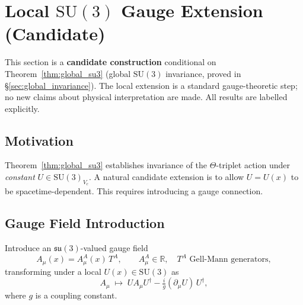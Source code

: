 %
%


\section{Local $\mathrm{SU}(3)$ Gauge Extension (Candidate)}
\label{sec:local_gauge}

\begin{tcolorbox}[colback=yellow!5!white,colframe=orange!80!black,
  title=Status: Candidate Extension]
  This section is a \textbf{candidate construction} conditional on
  Theorem~\ref{thm:global_su3} (global $\mathrm{SU}(3)$ invariance,
  proved in \S\ref{sec:global_invariance}).  The local extension is a
  standard gauge-theoretic step; no new claims about physical interpretation
  are made.  All results are labelled explicitly.
\end{tcolorbox}

\subsection{Motivation}

Theorem~\ref{thm:global_su3} establishes invariance of the $\Theta$-triplet
action under \emph{constant} $U\in\mathrm{SU}(3)_{V_c}$.  A natural candidate
extension is to allow $U=U(x)$ to be spacetime-dependent.  This requires
introducing a gauge connection.

\subsection{Gauge Field Introduction}

\begin{definition}
  \label{def:gauge_field}
  Introduce an $\mathfrak{su}(3)$-valued gauge field
  \begin{equation}
    A_\mu(x) = A_\mu^A(x)\,T^A,
    \qquad A_\mu^A\in\mathbb{R},\quad T^A\text{ Gell-Mann generators},
  \end{equation}
  transforming under a local $U(x)\in\mathrm{SU}(3)$ as
  \begin{equation}
    \label{eq:gauge_transform_A}
    A_\mu \;\mapsto\; U A_\mu U^\dagger - \tfrac{i}{g}(\partial_\mu U)\,U^\dagger,
  \end{equation}
  where $g$ is a coupling constant.
\end{definition}


